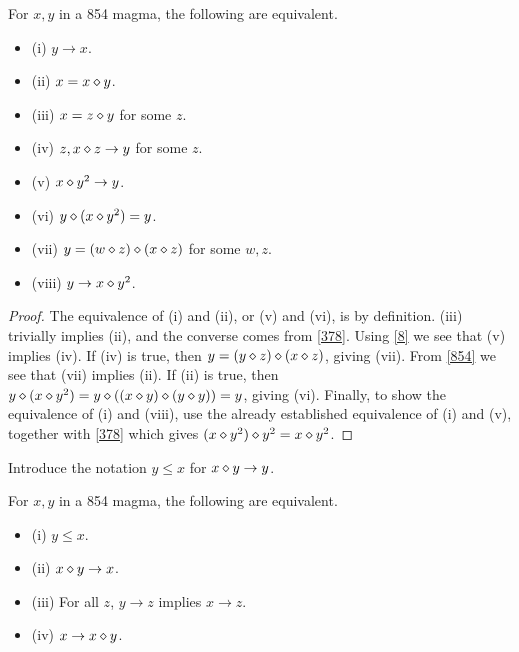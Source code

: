 \begin{lemma}[854 equivalences, I]\label{854-equiv}  For $x, y$ in a 854 magma, the following are equivalent.
  \begin{itemize}
  \item (i) $y \to x$.
  \item (ii) $x = x \diamond y$.
  \item (iii) $x = z \diamond y$ for some $z$.
  \item (iv) $z, x \diamond z \to y$ for some $z$.
  \item (v) $x \diamond y^2 \to y$.
  \item (vi) $y \diamond (x \diamond y^2) = y$.
  \item (vii) $y = (w \diamond z) \diamond (x \diamond z)$ for some $w,z$.
  \item (viii) $y \to x \diamond y^2$.
  \end{itemize}
\end{lemma}

\begin{proof} The equivalence of (i) and (ii), or (v) and (vi), is by definition.  (iii) trivially implies (ii), and the converse comes from \eqref{378}.  Using \eqref{8} we see that (v) implies (iv).  If (iv) is true, then $y = (y \diamond z) \diamond (x \diamond z)$, giving (vii).  From \eqref{854} we see that (vii) implies (ii).  If (ii) is true, then $y \diamond (x \diamond y^2) = y \diamond ((x \diamond y) \diamond (y \diamond y)) = y$, giving (vi).  Finally, to show the equivalence of (i) and (viii), use the already established equivalence of (i) and (v), together with \eqref{378} which gives $(x \diamond y^2) \diamond y^2 = x \diamond y^2$.
\end{proof}

Introduce the notation $y \leq x$ for $x \diamond y \to y$.

\begin{lemma}[854 equivalences, II]\label{854-equiv-2}  For $x,y$ in a 854 magma, the following are equivalent.
  \begin{itemize}
  \item (i) $y \leq x$.
  \item (ii) $x \diamond y \to x$.
  \item (iii)  For all $z$, $y \to z$ implies $x \to z$.
  \item (iv) $x \to x \diamond y$.
  \end{itemize}
\end{lemma}

